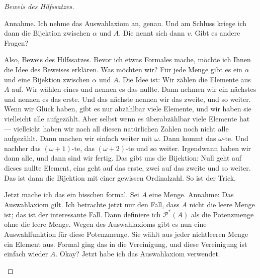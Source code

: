 \begin{proof}[Beweis des Hilfssatzes]
\begin{spoken-clean}[00:42:10 - 00:43:45]
Annahme. Ich nehme das Auswahlaxiom an, genau. Und am Schluss kriege ich dann die Bijektion zwischen $\alpha$ und $A$. Die nennt sich dann $v$. Gibt es andere Fragen?

Also, Beweis des Hilfssatzes. Bevor ich etwas Formales mache, möchte ich Ihnen die Idee des Beweises erklären. Was möchten wir? Für jede Menge gibt es ein $\alpha$ und eine Bijektion zwischen $\alpha$ und $A$. Die Idee ist: Wir zählen die Elemente aus $A$ auf. Wir wählen eines und nennen es das nullte. Dann nehmen wir ein nächstes und nennen es das erste. Und das nächste nennen wir das zweite, und so weiter. Wenn wir Glück haben, gibt es nur abzählbar viele Elemente, und wir haben sie vielleicht alle aufgezählt. Aber selbst wenn es überabzählbar viele Elemente hat --- vielleicht haben wir nach all diesen natürlichen Zahlen noch nicht alle aufgezählt. Dann machen wir einfach weiter mit $\omega$. Dann kommt das $\omega$-te. Und nachher das $(\omega+1)$-te, das $(\omega+2)$-te und so weiter. Irgendwann haben wir dann alle, und dann sind wir fertig. Das gibt uns die Bijektion: Null geht auf dieses nullte Element, eins geht auf das erste, zwei auf das zweite und so weiter. Das ist dann die Bijektion mit einer gewissen Ordinalzahl. So ist der Trick.
\end{spoken-clean}

\begin{spoken-clean}[00:43:45 - 00:45:14]
Jetzt mache ich das ein bisschen formal. Sei $A$ eine Menge. Annahme: Das Auswahlaxiom gilt. Ich betrachte jetzt nur den Fall, dass $A$ nicht die leere Menge ist; das ist der interessante Fall. Dann definiere ich $\mathcal{P}^*(A)$ als die Potenzmenge ohne die leere Menge. Wegen des Auswahlaxioms gibt es nun eine Auswahlfunktion für diese Potenzmenge. Sie wählt aus jeder nichtleeren Menge ein Element aus. Formal ging das in die Vereinigung, und diese Vereinigung ist einfach wieder $A$. Okay? Jetzt habe ich das Auswahlaxiom verwendet.
\end{spoken-clean}

\begin{ai-global-state-checkpoint-invisible-content}
\end{ai-global-state-checkpoint-invisible-content}


\end{proof}
